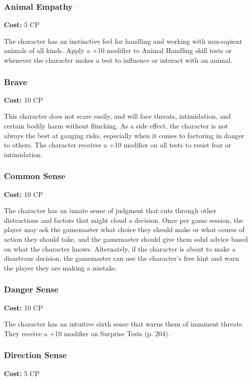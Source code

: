 \subsubsection{Animal Empathy}
\textbf{Cost:} 5 CP

The character has an instinctive feel for handling and working with non-sapient
animals of all kinds.  Apply a +10 modifier to Animal Handling skill tests or
whenever the character makes a test to influence or interact with an animal.

\subsubsection{Brave}
\textbf{Cost:} 10 CP

This character does not scare easily, and will face threats, intimidation, and
certain bodily harm without flinching. As a side effect, the character is not
always the best at gauging risks, especially when it comes to factoring in
danger to others. The character receives a +10 modifier on all tests to
resist fear or intimidation.

\subsubsection{Common Sense}
\textbf{Cost:} 10 CP

The character has an innate sense of judgment that cuts through other
distractions and factors that might cloud a decision. Once per game session,
the player may ask the gamemaster what choice they should make or what course
of action they should take, and the gamemaster should give them solid advice
based on what the character knows. Alternately, if the character is about to
make a disastrous decision, the gamemaster can use the character’s free hint
and warn the player they are making a mistake.

\subsubsection{Danger Sense}
\textbf{Cost:} 10 CP

The character has an intuitive sixth sense that warns them of imminent
threats. They receive a +10 modifier on Surprise Tests (p. 204).

\subsubsection{Direction Sense}
\textbf{Cost:} 5 CP

